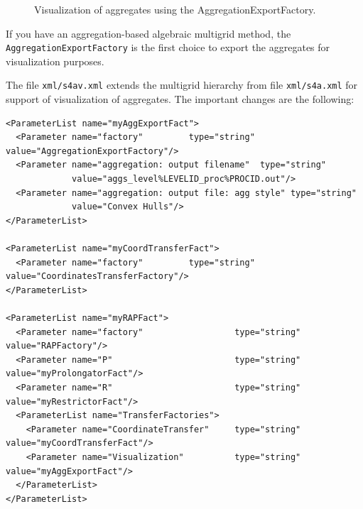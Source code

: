 \documentclass[10pt,fleqn]{book}
\begin{document}
\begin{figure}
\begin{center}
{
} %
\end{center}
\caption{Visualization of aggregates using the AggregationExportFactory.}
\label{fig:simpledesignaggregatesvis}
\end{figure}

If you have an aggregation-based algebraic multigrid method, the \verb|AggregationExportFactory| is the first choice to export the aggregates for visualization purposes.

The file \verb|xml/s4av.xml| extends the multigrid hierarchy from file \verb|xml/s4a.xml| for support of visualization of aggregates.
The important changes are the following:

{\small
\begin{lstlisting}
<ParameterList name="myAggExportFact">
  <Parameter name="factory"         type="string" value="AggregationExportFactory"/>
  <Parameter name="aggregation: output filename"  type="string"
             value="aggs_level%LEVELID_proc%PROCID.out"/>
  <Parameter name="aggregation: output file: agg style" type="string"
             value="Convex Hulls"/>
</ParameterList>

<ParameterList name="myCoordTransferFact">
  <Parameter name="factory"         type="string" value="CoordinatesTransferFactory"/>
</ParameterList>

<ParameterList name="myRAPFact">
  <Parameter name="factory"                  type="string" value="RAPFactory"/>
  <Parameter name="P"                        type="string" value="myProlongatorFact"/>
  <Parameter name="R"                        type="string" value="myRestrictorFact"/>
  <ParameterList name="TransferFactories">
    <Parameter name="CoordinateTransfer"     type="string" value="myCoordTransferFact"/>
    <Parameter name="Visualization"          type="string" value="myAggExportFact"/>
  </ParameterList>
</ParameterList>
\end{lstlisting}
}
\end{document}
